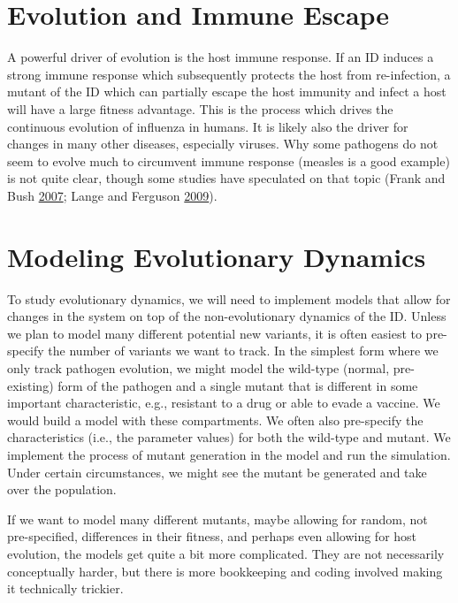 \documentclass[]{book}
\theoremstyle{definition}
\theoremstyle{definition}
\theoremstyle{definition}
\theoremstyle{remark}
\begin{document}
\section{Evolution and Immune Escape}\label{evolution-and-immune-escape}

A powerful driver of evolution is the host immune response. If an ID
induces a strong immune response which subsequently protects the host
from re-infection, a mutant of the ID which can partially escape the
host immunity and infect a host will have a large fitness advantage.
This is the process which drives the continuous evolution of influenza
in humans. It is likely also the driver for changes in many other
diseases, especially viruses. Why some pathogens do not seem to evolve
much to circumvent immune response (measles is a good example) is not
quite clear, though some studies have speculated on that topic (Frank
and Bush \protect\hyperlink{ref-frank07}{2007}; Lange and Ferguson
\protect\hyperlink{ref-lange09}{2009}).

\section{Modeling Evolutionary
Dynamics}\label{modeling-evolutionary-dynamics}

To study evolutionary dynamics, we will need to implement models that
allow for changes in the system on top of the non-evolutionary dynamics
of the ID. Unless we plan to model many different potential new
variants, it is often easiest to pre-specify the number of variants we
want to track. In the simplest form where we only track pathogen
evolution, we might model the wild-type (normal, pre-existing) form of
the pathogen and a single mutant that is different in some important
characteristic, e.g., resistant to a drug or able to evade a vaccine. We
would build a model with these compartments. We often also pre-specify
the characteristics (i.e., the parameter values) for both the wild-type
and mutant. We implement the process of mutant generation in the model
and run the simulation. Under certain circumstances, we might see the
mutant be generated and take over the population.

If we want to model many different mutants, maybe allowing for random,
not pre-specified, differences in their fitness, and perhaps even
allowing for host evolution, the models get quite a bit more
complicated. They are not necessarily conceptually harder, but there is
more bookkeeping and coding involved making it technically trickier.
\end{document}
